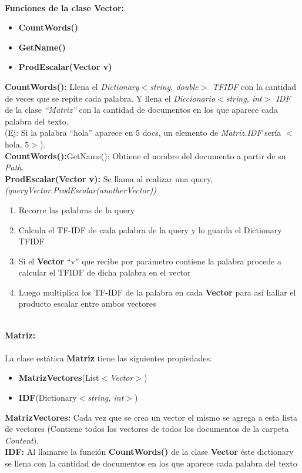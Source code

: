 \documentclass[10pt, letterpaper]{article}
\begin{document}
    \textbf{\\\large{Funciones de la clase Vector:}}
    \begin{itemize}
        \item  \textbf{CountWords()}
        \item \textbf{GetName()}
        \item  \textbf{ProdEscalar(Vector v)}
    \end{itemize}

    \textbf{CountWords():} Llena el \textit{Dictionary$<$string, double$>$ TFIDF} con la cantidad de veces que se repite cada palabra. Y 
    llena el \textit{Diccionario$<$string, int$>$ IDF} de la clase \textit{“Matriz”} con la cantidad de documentos en los 
    que aparece cada palabra del texto.\\
    (Ej: Si la palabra “hola” aparece en 5 docs, un elemento de \textit{Matriz.IDF} sería $<$hola, 5$>$).\\
    \textbf{CountWords():}GetName(): Obtiene el nombre del documento a partir de su \textit{Path}.\\
    \textbf{ProdEscalar(Vector v):} Se llama al realizar una query,
    \textit{(queryVector.ProdEscalar(anotherVector))}
    
    \begin{enumerate}
        \item Recorre las palabras de la query
        \item Calcula el TF-IDF de cada palabra de la query y lo guarda el Dictionary TFIDF
        \item Si el \textbf{Vector} “v” que recibe por parámetro contiene la palabra procede a calcular el TFIDF de dicha palabra en el vector
        \item Luego multiplica los TF-IDF de la palabra en cada \textbf{Vector} para así hallar el producto escalar entre ambos vectores 
    \end{enumerate}
    
    \textbf{
        \\\large{Matriz:}\\
        \\
    }
    La clase estática \textbf{Matriz} tiene las siguientes propiedades: 
    \begin{itemize}
        \item  \textbf{MatrizVectores}(List\textit{$<$Vector$>$})
        \item \textbf{IDF}(Dictionary\textit{$<$string, int$>$})
    \end{itemize}
    \textbf{MatrizVectores:} Cada vez que se crea un vector el mismo se agrega a esta lista de vectores 
    (Contiene todos los vectores de todos los documentos de la carpeta \textit{Content}). \\
    \textbf{IDF:} Al llamarse la función \textbf{CountWords()} de la clase \textbf{Vector} éste dictionary se llena con la 
    cantidad de documentos en los que aparece cada palabra del texto\\
    
\end{document}
